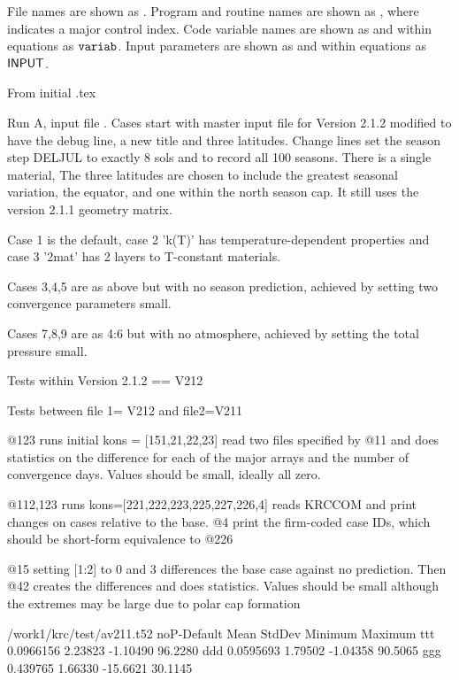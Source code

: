 \documentclass{article}  %
\begin{document}
File names are shown as . 
Program and routine names are shown as  , where 
indicates a major control index. 
Code variable names are shown as  and within equations as $\mathtt{varia
b}$.  
Input parameters are shown as  and within equations as $\mathsf{INPUT}$.


\hrulefill  From initial .tex \hrulefill

 Run A, input file . Cases start with master input file for Version 2.1.2
 modified to have the debug line, a new title and three latitudes. Change lines
 set the season step DELJUL to exactly 8 sols and to record all 100
 seasons. There is a single material, The three latitudes are chosen to include the
 greatest seasonal variation, the equator, and one within the north season
 cap. It still uses the version 2.1.1 geometry matrix.

 Case 1 is the default, case 2 'k(T)' has temperature-dependent properties and case 3  '2mat' has 2 layers to T-constant materials.

Cases 3,4,5 are as above but with no season prediction, achieved by setting two convergence parameters small.

Cases 7,8,9 are as 4:6 but with no atmosphere, achieved by setting the total pressure small.


Tests within Version 2.1.2 == V212

Tests between file 1= V212 and file2=V211

@123 runs initial kons = [151,21,22,23] read two files specified by @11
 and does statistics on the difference for each of the major arrays and
the number of convergence days. Values should be small, ideally all zero.


@112,123 runs kons=[221,222,223,225,227,226,4] reads KRCCOM and print changes on
cases relative to the base. @4 print the firm-coded case IDs, which should be
short-form equivalence to @226

@15 setting [1:2] to 0 and 3 differences the base case against no prediction. Then @42 creates the differences and does statistics.   Values should be small although the extremes may be large due to polar cap formation 


/work1/krc/test/av211.t52  noP-Default
           Mean       StdDev      Minimum      Maximum
ttt    0.0966156      2.23823     -1.10490      96.2280
ddd    0.0595693      1.79502     -1.04358      90.5065
ggg     0.439765      1.66330     -15.6621      30.1145
\end{document}
